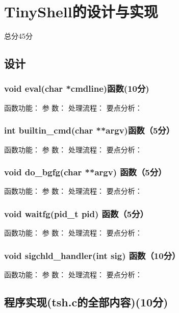 \section{TinyShell的设计与实现}
\begin{center}
    总分45分
\end{center}

\subsection{设计}

\subsubsection{void eval(char *cmdline)函数(10分)}

函数功能：
参    数：
处理流程：
要点分析：

\subsubsection{int builtin\_cmd(char **argv)函数（5分）}

函数功能：
参    数：
处理流程：
要点分析：

\subsubsection{void do\_bgfg(char **argv) 函数（5分）}

函数功能：
参    数：
处理流程：
要点分析：

\subsubsection{void waitfg(pid\_t pid) 函数（5分）}

函数功能：
参    数：
处理流程：
要点分析：

\subsubsection{void sigchld\_handler(int sig) 函数（10分）}

函数功能：
参    数：
处理流程：
要点分析：

\subsection{程序实现(tsh.c的全部内容)(10分)}
